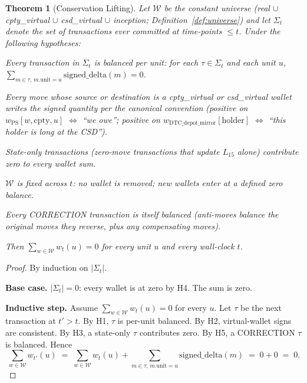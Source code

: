 \documentclass[11pt,a4paper]{article}
\newtheorem{theorem}[definition]{Theorem}
\begin{document}
\begin{theorem}[Conservation Lifting]
\label{thm:lifting}
Let $\mathcal{W}$ be the constant universe (real $\cup$ cpty\_virtual $\cup$ csd\_virtual $\cup$ inception; Definition~\ref{def:universe}) and let $\Sigma_t$ denote the set of transactions ever committed at time-points $\leq t$. Under the following hypotheses:
\begin{description}[nosep,leftmargin=2em]
\item[H1 (move balance)] Every transaction in $\Sigma_t$ is balanced per unit: for each $\tau \in \Sigma_t$ and each unit $u$, $\sum_{m \in \tau,\, m.\mathrm{unit}=u} \mathrm{signed\_delta}(m) = 0$.
\item[H2 (virtual sign correctness)] Every move whose source or destination is a cpty\_virtual or csd\_virtual wallet writes the signed quantity per the canonical convention (positive on $w_{\mathrm{PS}}[w, \mathrm{cpty}, u]$ $\Leftrightarrow$ ``we owe''; positive on $w_{\mathrm{DTC\_depot\_mirror}}[\mathrm{holder}]$ $\Leftrightarrow$ ``this holder is long at the CSD'').
\item[H3 (state-only moves vacuous)] State-only transactions (zero-move transactions that update $L_{15}$ alone) contribute zero to every wallet sum.
\item[H4 (universe constancy)] $\mathcal{W}$ is fixed across $t$: no wallet is removed; new wallets enter at a defined zero balance.
\item[H5 (CORRECTION respects H1)] Every CORRECTION transaction is itself balanced (anti-moves balance the original moves they reverse, plus any compensating moves).
\end{description}
Then $\sum_{w \in \mathcal{W}} w_t(u) = 0$ for every unit $u$ and every wall-clock $t$.
\end{theorem}

\begin{proof}
By induction on $|\Sigma_t|$.

\textbf{Base case.} $|\Sigma_t| = 0$: every wallet is at zero by H4. The sum is zero.

\textbf{Inductive step.} Assume $\sum_{w \in \mathcal{W}} w_t(u) = 0$ for every $u$. Let $\tau$ be the next transaction at $t' > t$. By H1, $\tau$ is per-unit balanced. By H2, virtual-wallet signs are consistent. By H3, a state-only $\tau$ contributes zero. By H5, a CORRECTION $\tau$ is balanced. Hence
\[
\sum_{w \in \mathcal{W}} w_{t'}(u) \;=\; \sum_{w \in \mathcal{W}} w_t(u) + \sum_{m \in \tau,\, m.\mathrm{unit}=u} \mathrm{signed\_delta}(m) \;=\; 0 + 0 \;=\; 0.
\]
\end{proof}
\end{document}
